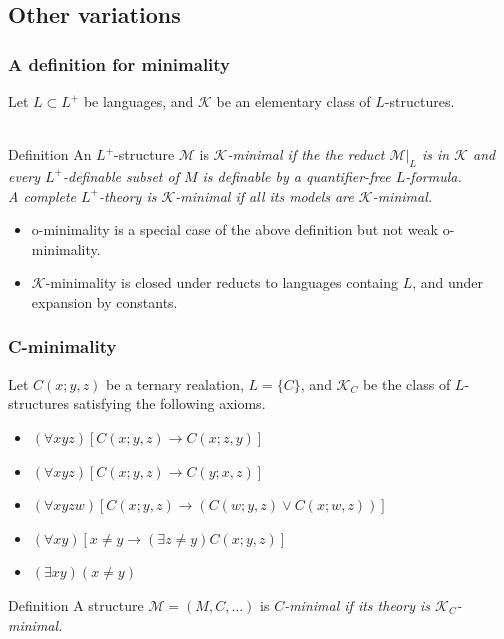 \subsection{Other variations}

\begin{frame}[t]\frametitle{A definition for minimality}
    
	Let $L\subset L^{+}$ be languages, and $\mathcal{K}$ be an elementary 
	class of $L$-structures.\\~\\
	\begin{beamerboxesrounded}[shadow=true]{Definition \citep{macpherson1996variants}}
		An $L^{+}$-structure $\mathcal{M}$ is \em $\mathcal{K}$-minimal \em if the 
		the reduct $\mathcal{M}|_{L}$ is in $\mathcal{K}$ and every $L^{+}$-definable subset of $M$ is definable by a quantifier-free $L$-formula.\\
		A complete $L^{+}$-theory is \em $\mathcal{K}$-minimal \em if all its models are $\mathcal{K}$-minimal.
	\end{beamerboxesrounded}

	\begin{itemize}
		\item[$\color{darkred}\bigstar$] o-minimality is a special case of the above definition but not weak o-minimality.
		\item[$\color{darkred}\bigstar$] $\mathcal{K}$-minimality is closed under reducts to languages containg $L$, and under expansion by constants.
	\end{itemize}

\end{frame}

\begin{frame}[t]\frametitle{C-minimality}
    
	Let $C(x;y,z)$ be a ternary realation, $L=\{ C \}$, and $\mathcal{K}_{C}$ 
	be the class of $L$-structures satisfying the following axioms.

	\begin{itemize}
		\item $(\forall xyz)[C(x;y,z)\to C(x;z,y)]$
		\item $(\forall xyz)[C(x;y,z)\to C(y;x,z)]$
		\item $(\forall xyzw)[C(x;y,z)\to (C(w;y,z) \vee C(x;w,z))]$
		\item $(\forall xy)[x\neq y \to (\exists z \neq y)C(x;y,z)]$
		\item $(\exists xy)(x\neq y)$
	\end{itemize}

	\begin{beamerboxesrounded}[shadow=true]{Definition}
		A structure $\mathcal{M}=(M,C,\ldots)$ is \em $C$-minimal \em if 
		its theory is $\mathcal{K}_{C}$-minimal.
	\end{beamerboxesrounded}

\end{frame}

